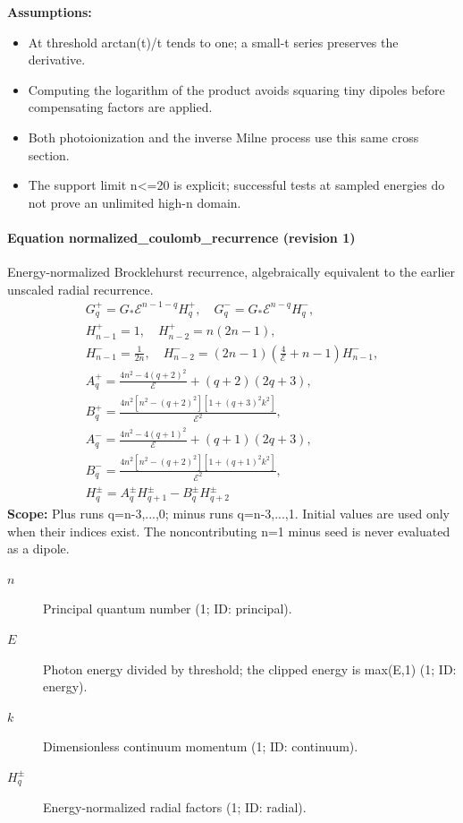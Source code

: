 \noindent\textbf{Assumptions:}
\begin{itemize}
\item At threshold arctan(t)/t tends to one; a small-t series preserves the derivative.
\item Computing the logarithm of the product avoids squaring tiny dipoles before compensating factors are applied.
\item Both photoionization and the inverse Milne process use this same cross section.
\item The support limit n<=20 is explicit; successful tests at sampled energies do not prove an unlimited high-n domain.
\end{itemize}

\paragraph{Equation normalized\_coulomb\_recurrence (revision 1)}
Energy-normalized Brocklehurst recurrence, algebraically equivalent to the earlier unscaled radial recurrence.
\begin{equation}
\begin{aligned}
G_q^+=G_*\mathcal E^{n-1-q}H_q^+,\quad G_q^-=G_*\mathcal E^{n-q}H_q^-,\\
H^+_{n-1}=1,\quad H^+_{n-2}=n(2n-1),\\
H^-_{n-1}=\frac1{2n},\quad H^-_{n-2}=(2n-1)\left(\frac4{\mathcal E}+n-1\right)H^-_{n-1},\\
A_q^+=\frac{4n^2-4(q+2)^2}{\mathcal E}+(q+2)(2q+3),\\
B_q^+=\frac{4n^2[n^2-(q+2)^2][1+(q+3)^2k^2]}{\mathcal E^2},\\
A_q^-=\frac{4n^2-4(q+1)^2}{\mathcal E}+(q+1)(2q+3),\\
B_q^-=\frac{4n^2[n^2-(q+2)^2][1+(q+1)^2k^2]}{\mathcal E^2},\\
H_q^\pm=A_q^\pm H_{q+1}^\pm-B_q^\pm H_{q+2}^\pm
\end{aligned}
\label{eq:escape.atom_5f_convergence:normalized_5f_coulomb_5f_recurrence:1}
\end{equation}
\noindent\textbf{Scope:} Plus runs q=n-3,...,0; minus runs q=n-3,...,1. Initial values are used only when their indices exist. The noncontributing n=1 minus seed is never evaluated as a dipole.

\begin{description}
\item[$n$] Principal quantum number (1; ID: principal).
\item[$E$] Photon energy divided by threshold; the clipped energy is max(E,1) (1; ID: energy).
\item[$k$] Dimensionless continuum momentum (1; ID: continuum).
\item[$H_q^\pm$] Energy-normalized radial factors (1; ID: radial).
\end{description}

